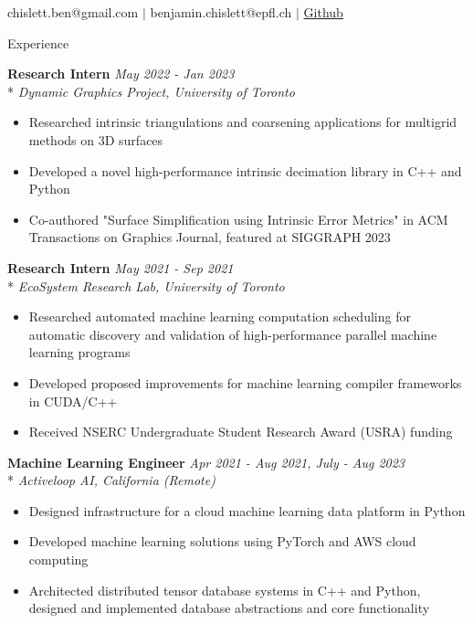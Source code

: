 \documentclass[11pt, letterpaper]{article}
\title{}
\author{Benjamin Chislett}
\date{}
\begin{document}
\begin{center}
  \Huge\theauthor
  \par
  \vspace{1mm}
  \large{chislett.ben@gmail.com} $|$ \large{benjamin.chislett@epfl.ch} $|$ \faGithub \hspace{.5pt} \href{https://github.com/benchislett}{Github}
  \par

\end{center}

\begin{section}{Experience}

\textbf{Research Intern}
\hfill
\textit{May 2022 - Jan 2023}\\*
\textit{Dynamic Graphics Project, University of Toronto}
\begin{itemize}
  \item Researched intrinsic triangulations and coarsening applications for multigrid methods on 3D surfaces
  \item Developed a novel high-performance intrinsic decimation library in C++ and Python
  \item Co-authored "Surface Simplification using Intrinsic Error Metrics" in ACM Transactions on Graphics Journal, featured at SIGGRAPH 2023 \\
\end{itemize}

\textbf{Research Intern}
\hfill
\textit{May 2021 - Sep 2021}\\*
\textit{EcoSystem Research Lab, University of Toronto}
\begin{itemize}
  \item Researched automated machine learning computation scheduling for automatic discovery and validation of high-performance parallel machine learning programs
  \item Developed proposed improvements for machine learning compiler frameworks in CUDA/C++
  \item Received NSERC Undergraduate Student Research Award (USRA) funding \\
\end{itemize}

\textbf{Machine Learning Engineer}
\hfill
\textit{Apr 2021 - Aug 2021, July - Aug 2023}\\*
\textit{Activeloop AI, California (Remote)}
\begin{itemize}
  \item Designed infrastructure for a cloud machine learning data platform in Python
  \item Developed machine learning solutions using PyTorch and AWS cloud computing
  \item Architected distributed tensor database systems in C++ and Python, designed and implemented database abstractions and core functionality \\
\end{itemize}


\end{section}
\end{document}
